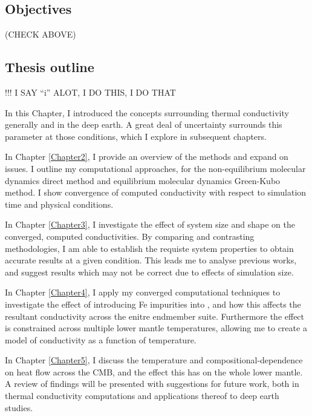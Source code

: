 \subsection{Objectives}

(CHECK ABOVE)

\subsection{Thesis outline}

!!! I SAY ``i'' ALOT, I DO THIS, I DO THAT

In this Chapter, I introduced the concepts surrounding thermal conductivity generally and in the deep earth. A great deal of uncertainty surrounds this parameter at those conditions, which I explore in subsequent chapters.

In Chapter \ref{Chapter2}, I provide an overview of the methods and expand on issues. I outline my computational approaches, for the non-equilibrium molecular dynamics direct method and equilibrium molecular dynamics Green-Kubo method. I show convergence of computed conductivity with respect to simulation time and physical conditions.

In Chapter \ref{Chapter3}, I investigate the effect of system size and shape on the converged, computed conductivities. By comparing and contrasting methodologies, I am able to establish the requiste system properties to obtain accurate results at a given condition. This leads me to analyse previous works, and suggest results which may not be correct due to effects of simulation size.

In Chapter \ref{Chapter4}, I apply my converged computational techniques to investigate the effect of introducing Fe impurities into \bdg, and how this affects the resultant conductivity across the enitre endmember suite. Furthermore the effect is constrained across multiple lower mantle temperatures, allowing me to create a model of \mgfesios conductivity as a function of temperature.

In Chapter \ref{Chapter5}, I discuss the temperature and compositional-dependence on heat flow across the CMB, and the effect this has on the whole lower mantle. A review of findings will be presented with suggestions for future work, both in thermal conductivity computations and applications thereof to deep earth studies.



